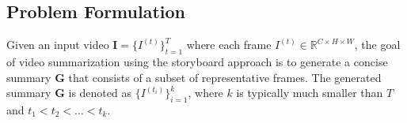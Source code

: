 \subsection{Problem Formulation}
\label{subsec:rel-formulation}
Given an input video $\textbf{I}=\{I^{(t)}\}_{t=1}^T$ where each frame $I^{(t)} \in \mathbb{R} ^{C \times H \times W}$, the goal of video summarization using the storyboard approach is to generate a concise summary $\textbf{G}$ that consists of a subset of representative frames. The generated summary $\textbf{G}$ is denoted as $\{I^{(t_i)}\}^k_{i=1}$, where $k$ is typically much smaller than $T$ and $t_1 < t_2 < \dots < t_k$.